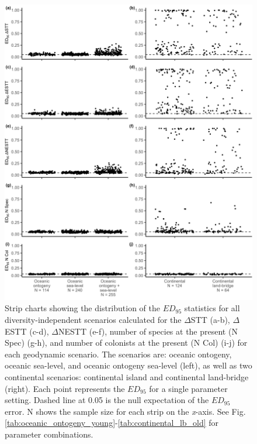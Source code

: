 \begin{figure}
    \centering
    \includegraphics[width=\textwidth]{JBI-21-0508_FigS6.png}
    \caption{Strip charts showing the distribution of the $ED_{95}$ statistics for all diversity-independent scenarios calculated for the $\Delta$STT (a-b), $\Delta$ESTT (c-d), $\Delta$NESTT (e-f), number of species at the present (N Spec) (g-h), and number of colonists at the present (N Col) (i-j) for each geodynamic scenario. The scenarios are: oceanic ontogeny, oceanic sea-level, and oceanic ontogeny sea-level (left), as well as two continental scenarios: continental island and continental land-bridge (right). Each point represents the $ED_{95}$ for a single parameter setting. Dashed line at 0.05 is the null expectation of the $ED_{95}$ error. N shows the sample size for each strip on the \textit{x}-axis. See Fig. \ref{tab:oceanic_ontogeny_young}-\ref{tab:continental_lb_old} for parameter combinations.}
    \label{fig:facet_scenario_di}
\end{figure}

